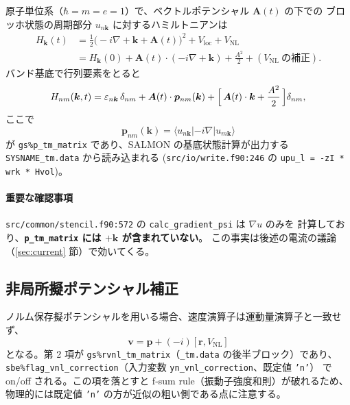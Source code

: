 \documentclass[dvipdfmx,a4paper,11pt]{jsarticle}
\newcommand{\file}[1]{\texttt{#1}}
\newcommand{\vk}{\bm{k}}
\newcommand{\vA}{\bm{A}}
\newcommand{\vp}{\bm{p}}
\newcommand{\vr}{\bm{r}}
\newcommand{\eps}{\varepsilon}
\begin{document}
原子単位系（$\hbar = m = e = 1$）で、ベクトルポテンシャル $\vA(t)$ の下での
ブロッホ状態の周期部分 $u_{n\vk}$ に対するハミルトニアンは
%
\begin{align}
  H_{\vk}(t)
  &= \frac{1}{2}\bigl(-i\nabla + \vk + \vA(t)\bigr)^2 + V_{\mathrm{loc}} + V_{\mathrm{NL}}
  \nonumber\\
  &= H_{\vk}(0) + \vA(t)\cdot(-i\nabla + \vk) + \frac{A^2}{2}
     + (V_{\mathrm{NL}}\ \text{の補正}).
  \label{eq:ham}
\end{align}
%
バンド基底で行列要素をとると
%
\begin{equation}
  H_{nm}(\vk,t)
  = \eps_{n\vk}\,\delta_{nm}
  + \vA(t)\cdot\vp_{nm}(\vk)
  + \Bigl[\,\vA(t)\cdot\vk + \frac{A^2}{2}\,\Bigr]\delta_{nm},
  \label{eq:hmat}
\end{equation}
%
ここで
%
\begin{equation}
  \vp_{nm}(\vk) = \langle u_{n\vk} | -i\nabla | u_{m\vk}\rangle
  \label{eq:pdef}
\end{equation}
%
が \file{gs\%p\_tm\_matrix} であり、SALMON の基底状態計算が出力する
\file{SYSNAME\_tm.data} から読み込まれる
(\file{src/io/write.f90:246} の \verb|upu_l = -zI * wrk * Hvol|)。

\paragraph{重要な確認事項}
\file{src/common/stencil.f90:572} の \verb|calc_gradient_psi| は $\nabla u$ のみを
計算しており、\textbf{\file{p\_tm\_matrix} には $+\vk$ が含まれていない}。
この事実は後述の電流の議論（\ref{sec:current} 節）で効いてくる。

\subsection{非局所擬ポテンシャル補正}

ノルム保存擬ポテンシャルを用いる場合、速度演算子は運動量演算子と一致せず、
%
\begin{equation}
  \bm{v} = \vp + (-i)[\vr, V_{\mathrm{NL}}]
  \label{eq:vnl}
\end{equation}
%
となる。第 2 項が \file{gs\%rvnl\_tm\_matrix}（\file{\_tm.data} の後半ブロック）であり、
\file{sbe\%flag\_vnl\_correction}（入力変数 \file{yn\_vnl\_correction}、既定値 \file{'n'}）
で on/off される。この項を落とすと f-sum rule（振動子強度和則）が破れるため、
物理的には既定値 \file{'n'} の方が近似の粗い側である点に注意する。
\end{document}
